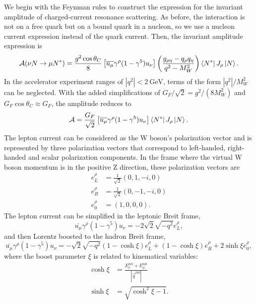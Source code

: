 We begin with the Feynman rules to construct the expression for the invariant amplitude of charged-current resonance scattering. As before, the interaction is not on a free quark but on a bound quark in a nucleon, so we use a nucleon current expression instead of the quark current. Then, the invariant amplitude expression is 
\begin{equation}
\mathcal{A}(\nu N \rightarrow \mu N^*) = \frac{g^2 \cos\theta_C}{8}\left[ \overline{u_\mu} \gamma^\rho(1-\gamma^5) u_\nu \right] \left(\frac{g_{\rho\eta}-q_\rho q_\eta}{q^2-M_W^2}\right) \bra{N^*}J_\rho\ket{N}.
\end{equation}
In the accelerator experiment ranges of $|q^2| < 2~\text{GeV}$, terms of the form $|q^2|/M_W^2$ can be neglected. With the added simplifications of $G_F/\sqrt{2} = g^2/(8M_W^2)$ and $G_F \cos\theta_C \approx G_F$, the amplitude reduces to
\begin{equation}
\mathcal{A} = \frac{G_F}{\sqrt{2}}\left[ \overline{u_\mu} \gamma^\rho(1-\gamma^5) u_\nu \right] \bra{N^*}J_\rho\ket{N}.
\end{equation}
The lepton current can be considered as the W boson's polarization vector and is represented by three polarization vectors that correspond to left-handed, right-handed and scalar polarization components. In the frame where the virtual W boson momentum is in the positive Z direction, these polarization vectors are
\begin{align}
e^\rho_L &= \frac{1}{\sqrt{2}}(0, 1, -i, 0)\\
e^\rho_R &= \frac{1}{\sqrt{2}}(0, -1, -i, 0)\\
e^\rho_0 &= (1,0,0,0).
\end{align}
The lepton current can be simplified in the leptonic Breit frame,
\begin{equation}
\overline{u_\mu} \gamma^\rho(1-\gamma^5) u_\nu = -2\sqrt{2}\sqrt{-q^2}e^\rho_L,
\end{equation}
and then Lorentz boosted to the hadron Breit frame,
\begin{equation}
\overline{u_\mu} \gamma^\rho(1-\gamma^5) u_\nu = -\sqrt{2}\sqrt{-q^2}(1-\cosh \xi)e^\rho_L +(1-\cosh\xi)e^\rho_R + 2 \sinh\xi e^\rho_0,
\end{equation}
where the boost parameter $\xi$ is related to kinematical variables:
\begin{align}
\cosh\xi &= \frac{E_\nu^{lab} + E_\mu^{lab}}{|\vec{q}^{lab}|} \\
\sinh \xi &= \sqrt{\cosh^2\xi -1}.
\end{align}
